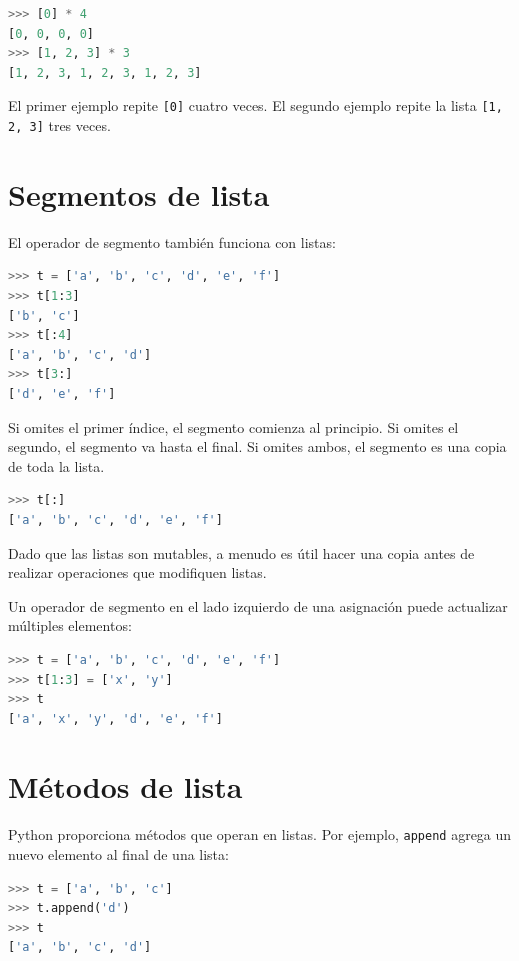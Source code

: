 \begin{lstlisting}[language=Python]
>>> [0] * 4 
[0, 0, 0, 0] 
>>> [1, 2, 3] * 3 
[1, 2, 3, 1, 2, 3, 1, 2, 3]
\end{lstlisting}

El primer ejemplo repite \texttt{[0]} cuatro veces. El segundo ejemplo repite la lista \texttt{[1, 2, 3]} tres veces.

\section{Segmentos de lista}

El operador de segmento también funciona con listas:

\begin{lstlisting}[language=Python]
>>> t = ['a', 'b', 'c', 'd', 'e', 'f'] 
>>> t[1:3] 
['b', 'c'] 
>>> t[:4] 
['a', 'b', 'c', 'd'] 
>>> t[3:] 
['d', 'e', 'f']
\end{lstlisting}

Si omites el primer índice, el segmento comienza al principio. Si omites el segundo, el segmento va hasta el final. Si omites ambos, el segmento es una copia de toda la lista.

\begin{lstlisting}[language=Python]
>>> t[:] 
['a', 'b', 'c', 'd', 'e', 'f']
\end{lstlisting}

Dado que las listas son mutables, a menudo es útil hacer una copia antes de realizar operaciones que modifiquen listas.

Un operador de segmento en el lado izquierdo de una asignación puede actualizar múltiples elementos:

\begin{lstlisting}[language=Python]
>>> t = ['a', 'b', 'c', 'd', 'e', 'f'] 
>>> t[1:3] = ['x', 'y'] 
>>> t 
['a', 'x', 'y', 'd', 'e', 'f']
\end{lstlisting}

\section{Métodos de lista}

Python proporciona métodos que operan en listas. Por ejemplo, \texttt{append} agrega un nuevo elemento al final de una lista:

\begin{lstlisting}[language=Python]
>>> t = ['a', 'b', 'c'] 
>>> t.append('d') 
>>> t 
['a', 'b', 'c', 'd']
\end{lstlisting}

